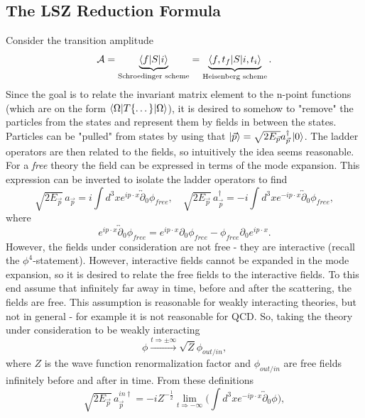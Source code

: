 \subsection*{The LSZ Reduction Formula}
Consider the transition amplitude
\begin{equation}
	\mathcal{A}=\underbrace{\braket{f|S|i}}_{\text{Schroedinger scheme}}=\underbrace{\braket{f,t_f|S|i,t_i}}_{\text{Heisenberg scheme}}.
\end{equation} 
Since the goal is to relate the invariant matrix element to the n-point functions (which are on the form $\braket{\Omega|T\{\dots\}|\Omega}$), it is desired to somehow to "remove" the particles from the states and represent them by fields in between the states. Particles can be "pulled" from states by using that $\ket{\vec{p}}=\sqrt{2E_{\vec{p}}}a_{\vec{p}}^\dagger\ket{0}$. The ladder operators are then related to the fields, so intuitively the idea seems reasonable. For a \emph{free} theory the field can be expressed in terms of the mode expansion. This expression can be inverted to isolate the ladder operators to find
\begin{equation}
	\sqrt{2E_{\vec{p}}}\,a_{\vec{p}}=i\int d^3x e^{ip\cdot x}\overleftrightarrow{\partial}_0\phi_{free}, \quad \sqrt{2E_{\vec{p}}}\,a_{\vec{p}}^\dagger=-i\int d^3x e^{-ip\cdot x}\overleftrightarrow{\partial}_0\phi_{free},
\end{equation} 
where
\begin{equation}
	e^{ip\cdot x} \overleftrightarrow{\partial}_0\phi_{free}=e^{ip\cdot x}\partial_0\phi_{free}-\phi_{free}\partial_0e^{ip\cdot x}.
\end{equation} 
However, the fields under consideration are not free - they are interactive (recall the $\phi^4$-statement). However, interactive fields cannot be expanded in the mode expansion, so it is desired to relate the free fields to the interactive fields. To this end assume that infinitely far away in time, before and after the scattering, the fields are free. This assumption is reasonable for weakly interacting theories, but not in general - for example it is not reasonable for QCD. So, taking the theory under consideration to be weakly interacting
\begin{equation}
	\phi\xrightarrow{t\Rightarrow \pm\infty}\sqrt{Z}\phi_{out/in},
\end{equation} 
where $Z$ is the wave function renormalization factor and $\phi_{out/in}$ are free fields infinitely before and after in time. From these definitions
\begin{equation}
	\sqrt{2E_{\vec{p}}}\,a_{\vec{p}}^{in \dagger}=-iZ^{-\frac{1}{2}}\lim_{t\Rightarrow -\infty}\bigg(\int d^3x e^{-ip\cdot x}\overleftrightarrow{\partial}_0\phi\bigg),
\end{equation} 
